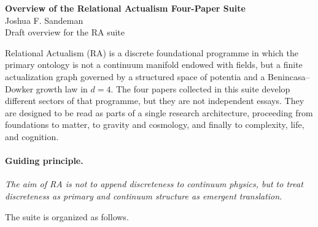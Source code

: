 \documentclass[11pt]{article}
\begin{document}
\begin{center}
    {\LARGE \textbf{Overview of the Relational Actualism Four-Paper Suite}}\\[1em]
    {\large Joshua F. Sandeman}\\[0.5em]
    {\small Draft overview for the RA suite}
\end{center}

\vspace{1em}

Relational Actualism (RA) is a discrete foundational programme in which the primary ontology is not a continuum manifold endowed with fields, but a finite actualization graph governed by a structured space of potentia and a Benincasa--Dowker growth law in $d=4$. The four papers collected in this suite develop different sectors of that programme, but they are not independent essays. They are designed to be read as parts of a single research architecture, proceeding from foundations to matter, to gravity and cosmology, and finally to complexity, life, and cognition.

\paragraph{Guiding principle.}
\emph{The aim of RA is not to append discreteness to continuum physics, but to treat discreteness as primary and continuum structure as emergent translation.}

The suite is organized as follows.
\end{document}
